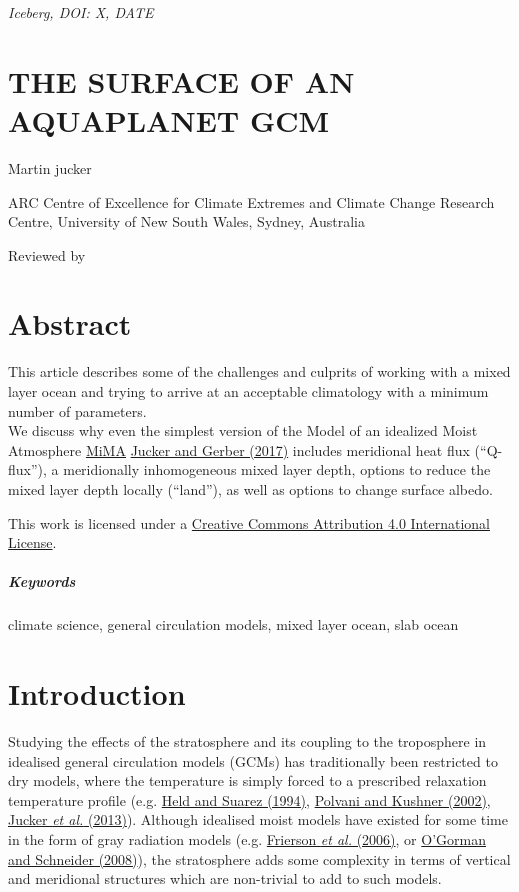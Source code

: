 \emph{Iceberg, DOI: X, DATE}

\section{THE SURFACE OF AN AQUAPLANET
GCM}\label{the-surface-of-an-aquaplanet-gcm}

Martin jucker

ARC Centre of Excellence for Climate Extremes and Climate Change
Research Centre, University of New South Wales, Sydney, Australia

Reviewed by

\section{Abstract}\label{abstract}

This article describes some of the challenges and culprits of working
with a mixed layer ocean and trying to arrive at an acceptable
climatology with a minimum number of parameters.\\
We discuss why even the simplest version of the Model of an idealized
Moist Atmosphere \href{https://github.com/mjucker/MiMA}{MiMA}
\href{http://journals.ametsoc.org/doi/10.1175/JCLI-D-17-0127.1}{Jucker
and Gerber (2017)} includes meridional heat flux (``Q-flux''), a
meridionally inhomogeneous mixed layer depth, options to reduce the
mixed layer depth locally (``land''), as well as options to change
surface albedo.

This work is licensed under a
\href{http://creativecommons.org/licenses/by/4.0/}{Creative Commons
Attribution 4.0 International License}.

\subparagraph{Keywords}\label{keywords}

climate science, general circulation models, mixed layer ocean, slab
ocean

\section{Introduction}\label{introduction}

Studying the effects of the stratosphere and its coupling to the
troposphere in idealised general circulation models (GCMs) has
traditionally been restricted to dry models, where the temperature is
simply forced to a prescribed relaxation temperature profile (e.g.
\href{http://journals.ametsoc.org/doi/abs/10.1175/1520-0477(1994)075\%3C1825:APFTIO\%3E2.0.CO;2}{Held
and Suarez (1994)},
\href{http://www.agu.org/pubs/crossref/2002/2001GL014284.shtml}{Polvani
and Kushner (2002)},
\href{http://journals.ametsoc.org/doi/abs/10.1175/JAS-D-12-0305.1}{Jucker
\emph{et al.} (2013)}). Although idealised moist models have existed for
some time in the form of gray radiation models (e.g.
\href{http://journals.ametsoc.org/doi/abs/10.1175/JAS3753.1}{Frierson
\emph{et al.} (2006)}, or
\href{https://doi.org/10.1175/2007JCLI2065.1}{O'Gorman and Schneider
(2008)}), the stratosphere adds some complexity in terms of vertical and
meridional structures which are non-trivial to add to such models.

